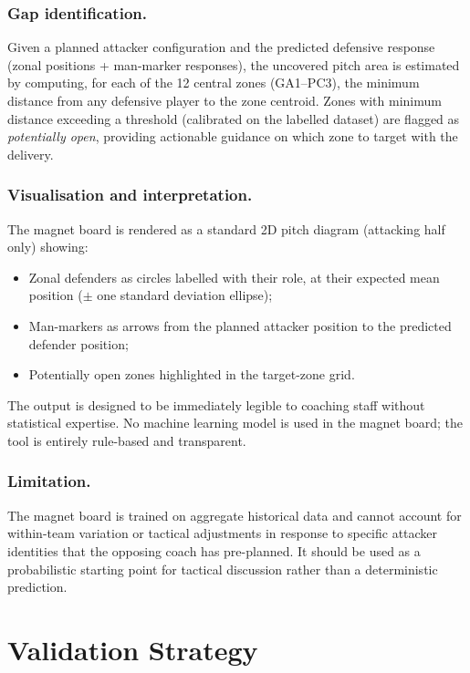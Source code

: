\subsubsection{Gap identification.}
Given a planned attacker configuration and the predicted defensive response
(zonal positions + man-marker responses), the uncovered pitch area is estimated
by computing, for each of the 12 central zones (GA1–PC3), the minimum distance
from any defensive player to the zone centroid. Zones with minimum distance
exceeding a threshold (calibrated on the labelled dataset) are flagged as
\textit{potentially open}, providing actionable guidance on which zone to target
with the delivery.

\subsubsection{Visualisation and interpretation.}
The magnet board is rendered as a standard 2D pitch diagram
(attacking half only) showing:
\begin{itemize}
  \item Zonal defenders as circles labelled with their role, at their expected
        mean position ($\pm$ one standard deviation ellipse);
  \item Man-markers as arrows from the planned attacker position to the
        predicted defender position;
  \item Potentially open zones highlighted in the target-zone grid.
\end{itemize}
The output is designed to be immediately legible to coaching staff without
statistical expertise. No machine learning model is used in the magnet board;
the tool is entirely rule-based and transparent.

\subsubsection{Limitation.}
The magnet board is trained on aggregate historical data and cannot account for
within-team variation or tactical adjustments in response to specific attacker
identities that the opposing coach has pre-planned. It should be used as a
probabilistic starting point for tactical discussion rather than a deterministic
prediction.

\section{Validation Strategy}
\label{sec:validation}

